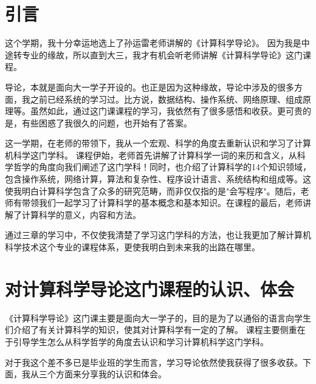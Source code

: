 \documentclass{article}
\begin{document}
\thispagestyle{empty}
\newpage
\setcounter{page}{1}
\section{引言}
这个学期，我十分幸运地选上了孙运雷老师讲解的《计算科学导论\citep{r1}》。
因为我是中途转专业的缘故，所以直到大三，我才有机会听老师讲解《计算科学导论》这门课程。\par
导论，本就是面向大一学子开设的。也正是因为这种缘故，导论中涉及的很多方面，我之前已经系统的学习过。比方说，数据结构、操作系统、网络原理、组成原理等。虽然如此，通过这门课课程的学习，我依然有了很多感悟和收获。更可贵的是，有些困惑了我很久的问题，也开始有了答案。\par
这一学期，在老师的带领下，我从一个宏观、科学的角度去重新认识和学习了计算机科学这门学科。
课程伊始，老师首先讲解了计算科学\citep{r2}一词的来历和含义，从科学哲学的角度向我们阐述了这门学科！同时，也介绍了计算科学的14个知识领域，包含操作系统，网络计算，算法和复杂性、程序设计语言、系统结构和组成等。这使我明白计算科学包含了众多的研究范畴，而非仅仅指的是"会写程序"。随后，老师有带领我们一起学习了计算科学的基本概念和基本知识。在课程的最后，老师讲解了计算科学的意义，内容和方法。\par
通过三章的学习中，不仅使我清楚了学习这门学科的方法，也让我更加了解计算机科学技术这个专业的课程体系，更使我明白到未来我的出路在哪里。

\section{对计算科学导论这门课程的认识、体会}
《计算科学导论》这门课主要是面向大一学子的，目的是为了以通俗的语言向学生们介绍了有关计算科学的知识，使其对计算科学有一定的了解。
课程主要侧重在于引导学生怎么从科学哲学的角度去认识和学习计算机科学这门学科。\par
对于我这个差不多已是毕业班的学生而言，学习导论依然使我获得了很多收获。下面，我从三个方面来分享我的认识和体会。\par
\end{document}
